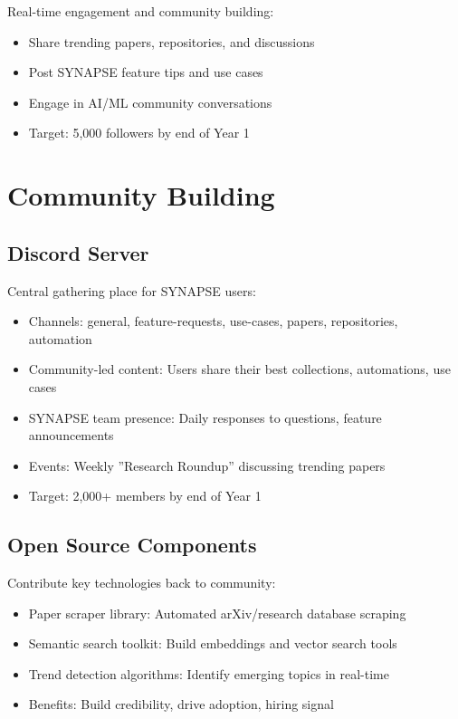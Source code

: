 \documentclass{report}
\begin{document}
Real-time engagement and community building:

\begin{itemize}
    \item Share trending papers, repositories, and discussions
    \item Post SYNAPSE feature tips and use cases
    \item Engage in AI/ML community conversations
    \item Target: 5,000 followers by end of Year 1
\end{itemize}

\section{Community Building}

\subsection{Discord Server}

Central gathering place for SYNAPSE users:

\begin{itemize}
    \item Channels: general, feature-requests, use-cases, papers, repositories, automation
    \item Community-led content: Users share their best collections, automations, use cases
    \item SYNAPSE team presence: Daily responses to questions, feature announcements
    \item Events: Weekly ''Research Roundup'' discussing trending papers
    \item Target: 2,000+ members by end of Year 1
\end{itemize}

\subsection{Open Source Components}

Contribute key technologies back to community:

\begin{itemize}
    \item Paper scraper library: Automated arXiv/research database scraping
    \item Semantic search toolkit: Build embeddings and vector search tools
    \item Trend detection algorithms: Identify emerging topics in real-time
    \item Benefits: Build credibility, drive adoption, hiring signal
\end{itemize}
\end{document}

